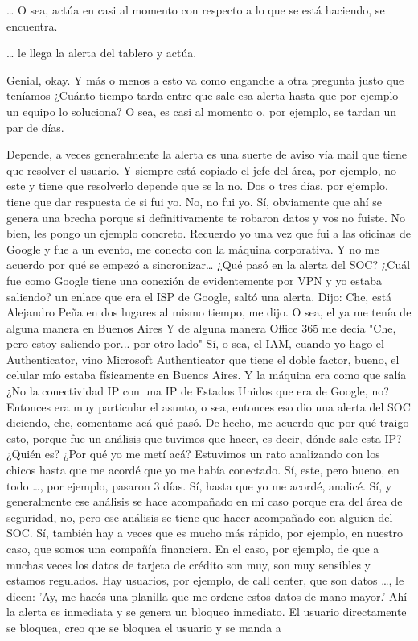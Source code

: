 \begin{description}[leftmargin=0cm, labelsep=0.5cm]
    \item[\textbf{MOCIULSKY SANTIAGO:}] … O sea, actúa en casi al momento con respecto a lo que se está haciendo, se encuentra.

    \item[\textbf{PEÑA ALEJANDRO FRANCISCO:}] … le llega la alerta del tablero y actúa.

    \item[\textbf{MOCIULSKY SANTIAGO:}] Genial, okay. Y más o menos a esto va como enganche a otra pregunta justo que teníamos ¿Cuánto tiempo tarda entre que sale esa alerta hasta que por ejemplo un equipo lo soluciona? O sea, es casi al momento o, por ejemplo, se tardan un par de días.

    \item[\textbf{PEÑA ALEJANDRO FRANCISCO:}] Depende, a veces generalmente la alerta es una suerte de aviso vía mail que tiene que resolver el usuario. Y siempre está copiado el jefe del área, por ejemplo, no este y tiene que resolverlo depende que se la no. Dos o tres días, por ejemplo, tiene que dar respuesta de si fui yo. No, no fui yo. Sí, obviamente que ahí se genera una brecha porque si definitivamente te robaron datos y vos no fuiste. No bien, les pongo un ejemplo concreto. Recuerdo yo una vez que fui a las oficinas de Google y fue a un evento, me conecto con la máquina corporativa. Y no me acuerdo por qué se empezó a sincronizar… ¿Qué pasó en la alerta del SOC? ¿Cuál fue como Google tiene una conexión de evidentemente por VPN y yo estaba saliendo? un enlace que era el ISP de Google, saltó una alerta. Dijo: Che, está Alejandro Peña en dos lugares al mismo tiempo, me dijo. O sea, el ya me tenía de alguna manera en Buenos Aires Y de alguna manera Office 365 me decía "Che, pero estoy saliendo por... por otro lado" Sí, o sea, el IAM, cuando yo hago el Authenticator, vino Microsoft Authenticator que tiene el doble factor, bueno, el celular mío estaba físicamente en Buenos Aires. Y la máquina era como que salía ¿No la conectividad IP con una IP de Estados Unidos que era de Google, no? Entonces era muy particular el asunto, o sea, entonces eso dio una alerta del SOC diciendo, che, comentame acá qué pasó. De hecho, me acuerdo que por qué traigo esto, porque fue un análisis que tuvimos que hacer, es decir, dónde sale esta IP? ¿Quién es? ¿Por qué yo me metí acá? Estuvimos un rato analizando con los chicos hasta que me acordé que yo me había conectado. Sí, este, pero bueno, en todo …, por ejemplo, pasaron 3 días. Sí, hasta que yo me acordé, analicé. Sí, y generalmente ese análisis se hace acompañado en mi caso porque era del área de seguridad, no, pero ese análisis se tiene que hacer acompañado con alguien del SOC. Sí, también hay a veces que es mucho más rápido, por ejemplo, en nuestro caso, que somos una compañía financiera. En el caso, por ejemplo, de que a muchas veces los datos de tarjeta de crédito son muy, son muy sensibles y estamos regulados. Hay usuarios, por ejemplo, de call center, que son datos …, le dicen: 'Ay, me hacés una planilla que me ordene estos datos de mano mayor.' Ahí la alerta es inmediata y se genera un bloqueo inmediato. El usuario directamente se bloquea, creo que se bloquea el usuario y se manda a 
\end{description}
